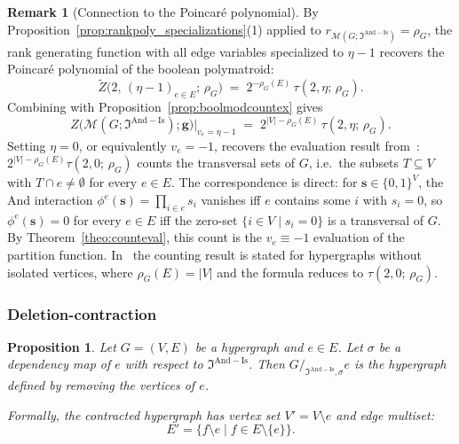 \documentclass[11pt,reqno]{amsart}
\newcommand{\vecs}{\boldsymbol{s}}
\newcommand{\vecg}{\boldsymbol{g}}
\newcommand{\Mo}{\mathcal{M}}
\newcommand{\mca}{\mathfrak{I}^{\mathrm{And-Is}}}
\theoremstyle{plain}
\newtheorem{proposition}[theorem]{Proposition}
\theoremstyle{definition}
\newtheorem{remark}[theorem]{Remark}
\numberwithin{equation}{section}
\begin{document}
\begin{remark}[Connection to the Poincar\'e polynomial]
\label{rem:and_ising_poincare}
By Proposition~\ref{prop:rankpoly_specializations}(1) applied to $r_{\Mo(G; \mca)} = \rho_G$, the rank generating function with all edge variables specialized to $\eta - 1$ recovers the Poincar\'e polynomial of the boolean polymatroid:
\[
    \widetilde Z\bigl(2,\, (\eta - 1)_{e \in E};\, \rho_G\bigr)
    \;=\;
    2^{-\rho_G(E)} \, \tau(2, \eta;\, \rho_G).
\]
Combining with Proposition~\ref{prop:boolmodcountex} gives
\[
    Z\bigl(\Mo(G; \mca); \vecg\bigr)\Big|_{v_e = \eta - 1}
    \;=\;
    2^{|V| - \rho_G(E)} \, \tau(2, \eta;\, \rho_G).
\] 
Setting $\eta = 0$, or equivalently $v_e = -1$, recovers the evaluation
result from~\cite[Corollary~3.10]{Helg}: $2^{|V| - \rho_G(E)}\tau(2,0;\, \rho_G)$ counts
the transversal sets of $G$, i.e.\ the subsets $T \subseteq V$ with
$T \cap e \neq \emptyset$ for every $e \in E$. The correspondence is
direct: for $\vecs \in \{0,1\}^V$, the And interaction
$\phi^e(\vecs) = \prod_{i \in e} s_i$ vanishes iff $e$ contains some
$i$ with $s_i = 0$, so $\phi^e(\vecs) = 0$ for every $e \in E$ iff
the zero-set $\{i \in V \mid s_i = 0\}$ is a transversal of $G$. By
Theorem~\ref{theo:counteval}, this count is the $v_e \equiv -1$
evaluation of the partition function. In~\cite{Helg} the counting result is stated for hypergraphs without isolated vertices, where $\rho_G(E) = |V|$ and the formula reduces to $\tau(2,0;\, \rho_G)$.
\end{remark}

\subsubsection{Deletion-contraction}

\begin{proposition}
    \label{prop:and_contraction}
    Let $G=(V,E)$ be a hypergraph and $e \in E$. Let $\sigma$ be a dependency map of $e$ with respect to $\mca$. Then $G/_{\mca, \sigma}e$ is the hypergraph defined by removing the vertices of $e$.
    
    Formally, the contracted hypergraph has vertex set $V' = V \setminus e$ and edge multiset:
    \[ E' = \{ f \setminus e \mid f \in E \setminus \{e\} \}. \]
\end{proposition}
\end{document}
